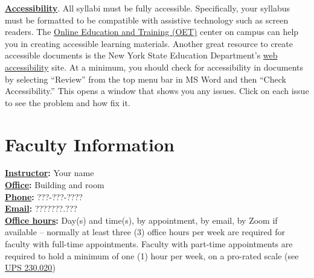 \documentclass[12pt]{article} %
\begin{document}
\vspace{1em}

\noindent\textbf{\underline{Accessibility}}. All syllabi must be fully accessible. Specifically, your syllabus must be formatted to be compatible with assistive technology such as screen readers. The \href{https://oet.fullerton.edu/}{Online Education and Training (OET)} center on campus can help you in creating accessible learning materials. Another great resource to create accessible documents is the New York State Education Department's \href{http://www.nysed.gov/webaccess}{web accessibility} site. At a minimum, you should check for accessibility in documents by selecting ``Review'' from the top menu bar in MS Word and then ``Check Accessibility.'' This opens a window that shows you any issues. Click on each issue to see the problem and how fix it.

\vspace{1em}

\maketitle


\section*{Faculty Information}
\noindent \textbf{\underline{Instructor}:} Your name 
\vspace{0.5em} \\
\noindent \textbf{\underline{Office}:} Building and room
\vspace{0.5em} \\
\noindent \textbf{\underline{Phone}:} ???-???-????
\vspace{0.5em} \\
\noindent \textbf{\underline{Email}:} ????\@???.???
\vspace{0.5em} \\ 
\noindent \textbf{\underline{Office hours}:} {\color{suggestionred}Day(s) and time(s), by appointment, by email, by Zoom if available} {\color{annotationblue}-- normally at least three (3) office hours per week are required for faculty with full-time appointments. Faculty with part-time appointments are required to hold a minimum of one (1) hour per week, on a pro-rated scale (see \href{https://www.fullerton.edu/senate/publications_policies_resolutions/ups/UPS\%20200/UPS\%20230.020.pdf}{UPS 230.020})}
\end{document}

